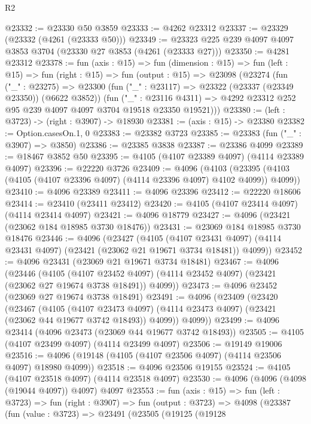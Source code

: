 \begin{lexlean}{R2}
\begin{coremodule}
@23332 := @23330 @50 @3859
@23333 := @4262 @23312
@23337 := @23329 (@23332 (@4261 (@23333 @50)))
@23349 := @23323 @225 @239 @4097 @4097 @3853 @3704 (@23330 @27 @3853 (@4261 (@23333 @27)))
@23350 := @4281 @23312
@23378 := fun (axis : @15) =>
  fun (dimension : @15) =>
  fun (left : @15) =>
  fun (right : @15) =>
  fun (output : @15) =>
  @23098
    (@23274
      (fun ("_" : @23275) =>
      @23300
        (fun ("_" : @23117) => @23322 (@23337 (@23349 @23350)) (@6622 @3852))
        (fun ("_" : @23116 @4311) =>
        @4292 @23312 @252 @95 @239 @4097 @4097 @3704 @19518 @23350 @19521)))
@23380 := (left : @3723) -> (right : @3907) -> @18930
@23381 := (axis : @15) -> @23380
@23382 := Option.casesOn.{1, 0}
@23383 := @23382 @3723
@23385 := @23383 (fun ("_" : @3907) => @3850)
@23386 := @23385 @3838
@23387 := @23386 @4099
@23389 := @18467 @3852 @50
@23395 := @4105 (@4107 @23389 @4097) (@4114 @23389 @4097)
@23396 := @22220 @3726
@23409 := @4096
    (@4103 (@23395 (@4103 (@4105 (@4107 @23396 @4097) (@4114 @23396 @4097) @4102 @4099)) @4099))
@23410 := @4096 @23389
@23411 := @4096 @23396
@23412 := @22220 @18606
@23414 := @23410 (@23411 @23412)
@23420 := @4105 (@4107 @23414 @4097) (@4114 @23414 @4097)
@23421 := @4096 @18779
@23427 := @4096 (@23421 (@23062 @184 @18985 @3730 @18476))
@23431 := @23069 @184 @18985 @3730 @18476
@23446 := @4096
    (@23427
      (@4105
        (@4107 @23431 @4097)
        (@4114 @23431 @4097)
        (@23421 (@23062 @21 @19671 @3734 @18481))
        @4099))
@23452 := @4096 @23431 (@23069 @21 @19671 @3734 @18481)
@23467 := @4096
    (@23446
      (@4105
        (@4107 @23452 @4097)
        (@4114 @23452 @4097)
        (@23421 (@23062 @27 @19674 @3738 @18491))
        @4099))
@23473 := @4096 @23452 (@23069 @27 @19674 @3738 @18491)
@23491 := @4096
    (@23409
      (@23420
        (@23467
          (@4105
            (@4107 @23473 @4097)
            (@4114 @23473 @4097)
            (@23421 (@23062 @44 @19677 @3742 @18493))
            @4099))
        @4099))
@23499 := @4096 @23414 (@4096 @23473 (@23069 @44 @19677 @3742 @18493))
@23505 := @4105 (@4107 @23499 @4097) (@4114 @23499 @4097)
@23506 := @19149 @19006
@23516 := @4096 (@19148 (@4105 (@4107 @23506 @4097) (@4114 @23506 @4097) @18980 @4099))
@23518 := @4096 @23506 @19155
@23524 := @4105 (@4107 @23518 @4097) (@4114 @23518 @4097)
@23530 := @4096 (@4096 (@4098 (@19044 @4097)) @4097) @4097
@23553 := fun (axis : @15) =>
  fun (left : @3723) =>
  fun (right : @3907) =>
  fun (output : @3723) =>
  @4098
    (@23387
      (fun (value : @3723) =>
      @23491
        (@23505
          (@19125
            (@19128

\end{coremodule}
\end{lexlean}
